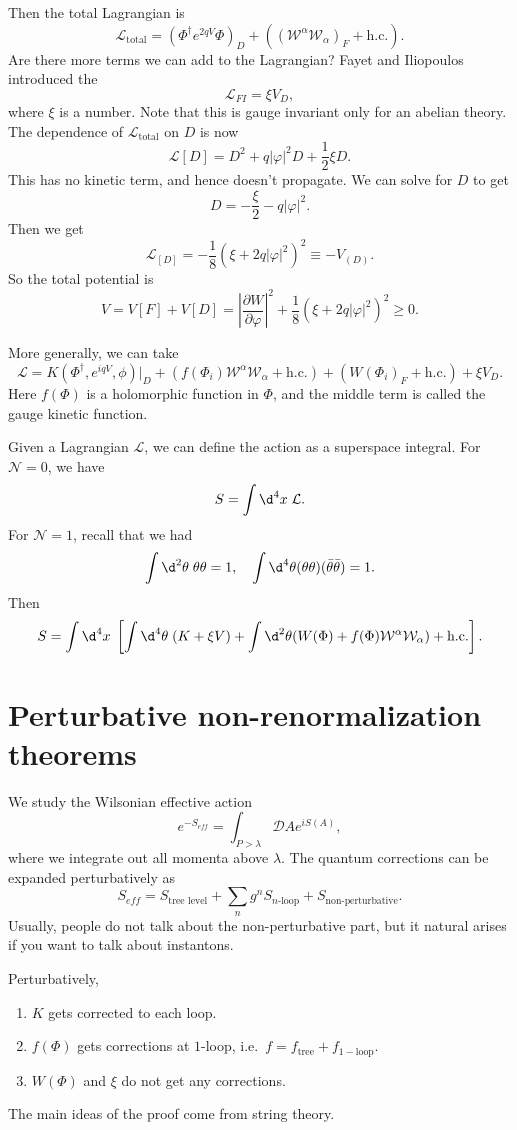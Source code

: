 \documentclass[a4paper]{article}
\begin{document}
Then the total Lagrangian is
\[
  \mathcal{L}_{\mathrm{total}} = (\Phi^\dagger e^{2qV} \Phi)_D + ((\mathcal{W}^\alpha \mathcal{W}_\alpha)_F + \text{h.c.}).
\]
Are there more terms we can add to the Lagrangian? Fayet and Iliopoulos introduced the 
\[
  \mathcal{L}_{FI} = \xi V_D,
\]
where $\xi$ is a number. Note that this is gauge invariant only for an abelian theory. The dependence of $\mathcal{L}_{\mathrm{total}}$ on $D$ is now
\[
  \mathcal{L}[D] = D^2 + q |\varphi|^2 D + \frac{1}{2} \xi D.
\]
This has no kinetic term, and hence doesn't propagate. We can solve for $D$ to get
\[
  D = - \frac{\xi}{2} - q |\varphi|^2.
\]
Then we get
\[
  \mathcal{L}_[D] = - \frac{1}{8} (\xi + 2q|\varphi|^2)^2 \equiv -V_{(D)}.
\]
So the total potential is
\[
  V = V[F] + V[D] = \left|\frac{\partial W}{\partial \varphi}\right|^2 + \frac{1}{8} (\xi + 2q|\varphi|^2)^2 \geq 0.
\]

More generally, we can take
\[
  \mathcal{L} = K(\Phi^\dagger, e^{iqV}, \phi)|_D + (f(\Phi_i) \mathcal{W}^\alpha \mathcal{W}_\alpha + \text{h.c.}) + (W(\Phi_i)_F + \text{h.c.}) + \xi V_D.
\]
Here $f(\Phi)$ is a holomorphic function in $\Phi$, and the middle term is called the gauge kinetic function.

Given a Lagrangian $\mathcal{L}$, we can define the action as a superspace integral. For $\mathcal{N} = 0$, we have
\[
  S = \int \d^4 x\; \mathcal{L}.
\]
For $\mathcal{N} = 1$, recall that we had
\[
  \int \d^2 \theta\; \theta \theta = 1,\quad \int\d^4 \theta (\theta\theta)(\bar{\theta} \bar{\theta}) = 1.
\]
Then
\[
  S = \int \d^4 x\; \left[\int \d^4 \theta\; (K + \xi V) + \int \d^2 \theta (W(\Phi) + f(\Phi) \mathcal{W}^\alpha \mathcal{W}_\alpha) + \text{h.c.}\right].
\]

\section{Perturbative non-renormalization theorems}
We study the Wilsonian effective action
\[
  e^{-S_{eff}} = \int_{P > \lambda} \mathcal{D} A e^{i S(A)},
\]
where we integrate out all momenta above $\lambda$. The quantum corrections can be expanded perturbatively as
\[
  S_{eff} = S_{\text{tree level}} + \sum_n g^n S_{n\text{-loop}} + S_{\text{non-perturbative}}.
\]
Usually, people do not talk about the non-perturbative part, but it natural arises if you want to talk about instantons.

\begin{thm}
  Perturbatively,
  \begin{enumerate}
    \item $K$ gets corrected to each loop.
    \item $f(\Phi)$ gets corrections at $1$-loop, i.e.\ $f = f_{\mathrm{tree}} + f_{\mathrm{1-loop}}$.
    \item $W(\Phi)$ and $\xi$ do not get any corrections.
  \end{enumerate}
\end{thm}
The main ideas of the proof come from string theory.
\end{document}
